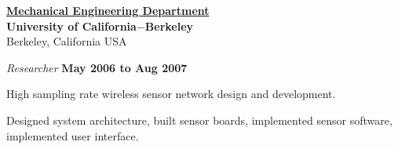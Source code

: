 \documentclass[10pt]{article}
\newenvironment{outerlist}[1][\enskip\textbullet]%
        {\begin{itemize}[#1]}{\end{itemize}%
         \vspace{-.6\baselineskip}}
\newenvironment{innerlist}[1][\enskip\textbullet]%
        {\begin{compactitem}[#1]}{\end{compactitem}}
\newcommand{\halfblankline}{\quad\vspace{-0.5\baselineskip}\pagebreak[3]}
\begin{document}
\halfblankline

\href{http://www.me.berkeley.edu/}{\textbf{Mechanical Engineering Department}}\\
\textbf{University of California$-$Berkeley}\\
Berkeley, California USA
\begin{outerlist}
\item[] \textit{Researcher}%
        \hfill \textbf{May 2006 to Aug 2007}
\begin{innerlist}
\item High sampling rate wireless sensor network design and development.
\item Designed system architecture, built sensor boards, implemented sensor software, implemented user interface.
\end{innerlist}
\end{outerlist}
\end{document}
